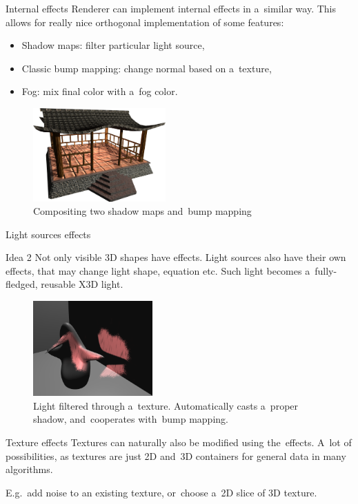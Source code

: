 \documentclass{beamer}
\begin{document}
\begin{frame}{Internal effects}
Renderer can implement internal effects in a~similar way.
This allows for really nice orthogonal implementation
of some features:

\begin{itemize}
  \item Shadow maps: filter particular light source,
  \item Classic bump mapping: change normal based on a~texture,
  \item Fog: mix final color with a~fog color.
\end{itemize}

\begin{figure}
  \centering
  \includegraphics[width=2in]{../rhan_shrine_5_everything}
  \caption{Compositing two shadow maps and~bump mapping}
\end{figure}
\end{frame}

\begin{frame}{Light sources effects}
\begin{block}{Idea 2}
Not only visible 3D shapes have effects.
Light sources also have their own effects, that may change light
shape, equation etc. Such light becomes a~fully-fledged, reusable X3D light.
\end{block}

\begin{figure}
  \centering
  \includegraphics[width=1.8in]{../fancy_light_spot_shape}
  \caption{Light filtered through a~texture. Automatically casts a~proper shadow, and~cooperates with~bump mapping.}
\end{figure}
\end{frame}

\begin{frame}[fragile]{Texture effects}
Textures can naturally also be modified using the~effects.
A~lot of possibilities, as textures are just 2D and~3D containers for general data
in many algorithms.

\vspace{0.1in}

E.g.~add noise to an existing texture, or~choose a~2D slice of 3D texture.
\end{frame}
\end{document}
